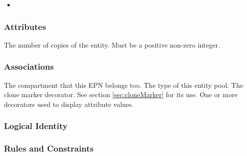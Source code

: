 \begin{itemize}
\item {}
\end{itemize}

\subsubsection{Attributes}

\begin{attributes}
   The number of copies of the entity. Must
  be a positive non-zero integer.
\end{attributes}

\subsubsection{Associations}

\begin{attributes}
  The compartment
  that this EPN belongs too.
 The type of this entity pool.
   The clone marker
  decorator. See section \ref{sec:cloneMarker} for its use.
  One or
 more decorators used to display attribute values.
\end{attributes}

\subsubsection{Logical Identity}

\begin{logicalkey}
\item {}
\item {}
\item {}
\end{logicalkey}

\subsubsection{Rules and Constraints}

